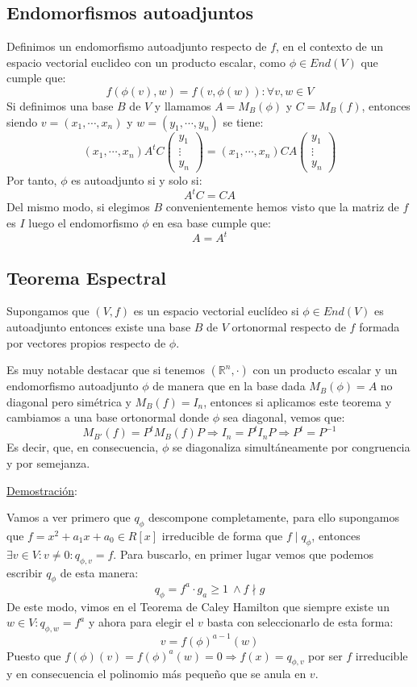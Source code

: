 \documentclass[10pt,a4paper,openright]{book}
\theoremstyle{break}
\begin{document}
\subsection{Endomorfismos autoadjuntos}
Definimos un endomorfismo autoadjunto respecto de $f$, en el contexto de un espacio vectorial euclideo con un producto escalar, como $\phi\in End(V)$ que cumple que:
$$f(\phi(v),w) = f(v,\phi(w)): \forall v,w\in V$$
Si definimos una base $B$ de $V$ y llamamos $A=M_B(\phi)$ y $C=M_B(f)$, entonces siendo $v=(x_1, \cdots, x_n)$ y $w=(y_1, \cdots, y_n)$ se tiene:
$$(x_1, \cdots, x_n) A^tC \begin{pmatrix} y_1 \\ \vdots \\ y_n\end{pmatrix} = (x_1, \cdots, x_n)CA\begin{pmatrix} y_1 \\ \vdots \\ y_n\end{pmatrix}$$
Por tanto, $\phi$ es autoadjunto si y solo si:
$$A^tC=CA$$
Del mismo modo, si elegimos $B$ convenientemente hemos visto que la matriz de $f$ es $I$ luego el endomorfismo $\phi$ en esa base cumple que:
$$A=A^t$$

\subsection{Teorema Espectral}
Supongamos que $(V,f)$ es un espacio vectorial euclídeo si $\phi\in End(V)$ es autoadjunto entonces existe una base $B$ de $V$ ortonormal respecto de $f$ formada por vectores propios respecto de $\phi$.

Es muy notable destacar que si tenemos $(\mathbb R^n, \cdot)$ con un producto escalar y un endomorfismo autoadjunto $\phi$ de manera que en la base dada $M_B(\phi) = A$ no diagonal pero simétrica y $M_B(f) = I_n$, entonces si aplicamos este teorema y cambiamos a una base ortonormal donde $\phi$ sea diagonal, vemos que:
$$M_{B'}(f) = P^t M_B(f) P \Rightarrow I_n = P^t I_n P\Rightarrow P^t =P^{-1}$$
Es decir, que, en consecuencia, $\phi$ se diagonaliza simultáneamente por congruencia y por semejanza.

\underline{Demostración}:

Vamos a ver primero que $q_\phi$ descompone completamente, para ello supongamos que $f = x^2+a_1x+a_0\in R[x]$ irreducible de forma que $f\mid q_\phi$, entonces $\exists v\in V: v\neq 0: q_{\phi,v} = f$. Para buscarlo, en primer lugar vemos que podemos escribir $q_\phi$ de esta manera:
$$q_\phi = f^a \cdot g_ a\geq 1 \ \wedge f\nmid g$$
De este modo, vimos en el Teorema de Caley Hamilton que siempre existe un $w\in V: q_{\phi, w} = f^a$ y ahora para elegir el $v$ basta con seleccionarlo de esta forma:
$$v= f(\phi)^{a-1}(w)$$
Puesto que $f(\phi)(v) = f(\phi)^a(w) = 0\Rightarrow f(x) = q_{\phi,v}$ por ser $f$ irreducible y en consecuencia el polinomio más pequeño que se anula en $v$.
\end{document}
